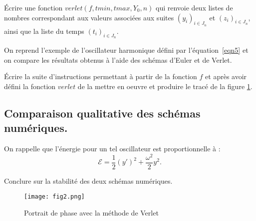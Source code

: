 \question{}
Écrire une fonction $verlet(f, tmin, tmax, Y_0, n)$ qui renvoie deux listes de nombres correspondant aux valeurs associées aux suites $\left(y_i\right)_{i\in J_n}$ et $\left(z_i\right)_{i\in J_n}$, ainsi que la liste du temps $\left(t_i\right)_{i\in J_n}$.

\bigskip

On reprend l'exemple de l'oscillateur harmonique défini par l'équation~\eqref{eqn5} et on compare les résultats obtenus à l'aide des schémas d'Euler et de Verlet.


\question{} \'Ecrire la suite d'instructions permettant à partir de la fonction $f$ et après avoir défini la fonction $verlet$ de la mettre en oeuvre et produire le tracé de la figure \ref{fig2}. 

\subsection{Comparaison qualitative des schémas numériques.}

On rappelle que l'énergie pour un tel oscillateur est proportionnelle à : 
\begin{equation*}
  \mathcal{E} = \dfrac{1}{2}(y')^2 + \dfrac{\omega^2}{2}y^2.
\end{equation*}

\question{} Conclure sur la stabilité des deux schémas numériques.

\begin{figure}[!h]
\begin{center}
\texttt{[image: fig2.png]}
\caption{Portrait de phase avec la méthode de Verlet\label{fig2}}
\end{center}
\end{figure}